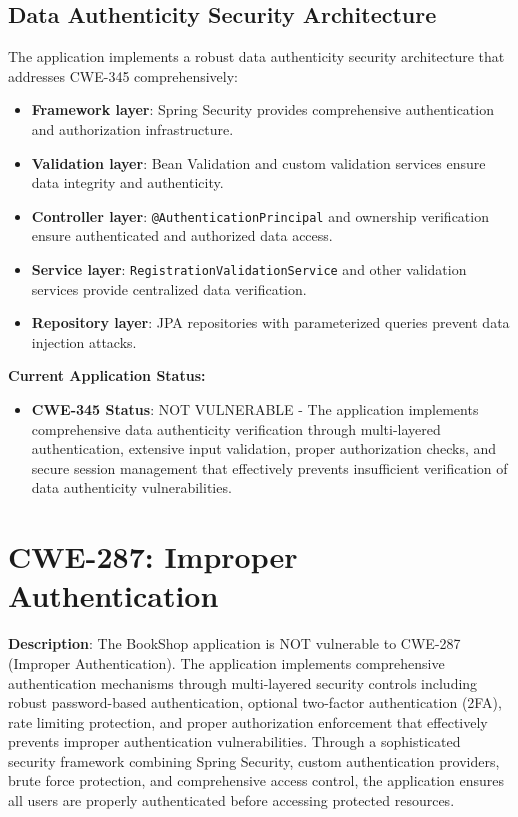 \documentclass[]{UCD_CS_FYP_Report}
\begin{document}
\subsection{Data Authenticity Security Architecture}
The application implements a robust data authenticity security architecture that addresses CWE-345 comprehensively:
\begin{itemize}
	\item \textbf{Framework layer}: Spring Security provides comprehensive authentication and authorization infrastructure.
	\item \textbf{Validation layer}: Bean Validation and custom validation services ensure data integrity and authenticity.
	\item \textbf{Controller layer}: \texttt{@AuthenticationPrincipal} and ownership verification ensure authenticated and authorized data access.
	\item \textbf{Service layer}: \texttt{RegistrationValidationService} and other validation services provide centralized data verification.
	\item \textbf{Repository layer}: JPA repositories with parameterized queries prevent data injection attacks.
\end{itemize}

\textbf{Current Application Status:}
\begin{itemize}
	\item \textbf{CWE-345 Status}: NOT VULNERABLE - The application implements comprehensive data authenticity verification through multi-layered authentication, extensive input validation, proper authorization checks, and secure session management that effectively prevents insufficient verification of data authenticity vulnerabilities.
\end{itemize}

\section{CWE-287: Improper Authentication}

\textbf{Description}: The BookShop application is NOT vulnerable to CWE-287 (Improper Authentication). The application implements comprehensive authentication mechanisms through multi-layered security controls including robust password-based authentication, optional two-factor authentication (2FA), rate limiting protection, and proper authorization enforcement that effectively prevents improper authentication vulnerabilities. Through a sophisticated security framework combining Spring Security, custom authentication providers, brute force protection, and comprehensive access control, the application ensures all users are properly authenticated before accessing protected resources.
\end{document}
